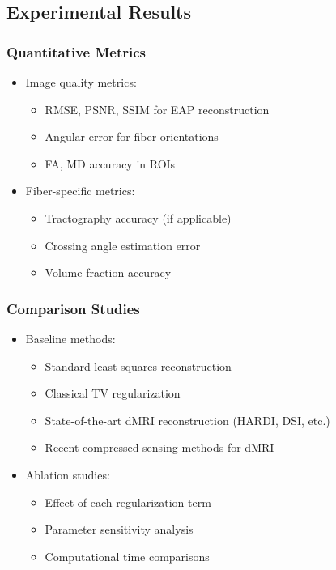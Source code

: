 \documentclass[journal,twoside,web]{ieeecolor}
\begin{document}
\subsection{Experimental Results}

\subsubsection{Quantitative Metrics}
\begin{itemize}
    \item Image quality metrics:
    \begin{itemize}
        \item RMSE, PSNR, SSIM for EAP reconstruction
        \item Angular error for fiber orientations
        \item FA, MD accuracy in ROIs
    \end{itemize}
    \item Fiber-specific metrics:
    \begin{itemize}
        \item Tractography accuracy (if applicable)
        \item Crossing angle estimation error
        \item Volume fraction accuracy
    \end{itemize}
\end{itemize}

\subsubsection{Comparison Studies}
\begin{itemize}
    \item Baseline methods:
    \begin{itemize}
        \item Standard least squares reconstruction
        \item Classical TV regularization
        \item State-of-the-art dMRI reconstruction (HARDI, DSI, etc.)
        \item Recent compressed sensing methods for dMRI
    \end{itemize}
    \item Ablation studies:
    \begin{itemize}
        \item Effect of each regularization term
        \item Parameter sensitivity analysis
        \item Computational time comparisons
    \end{itemize}
\end{itemize}
\end{document}
